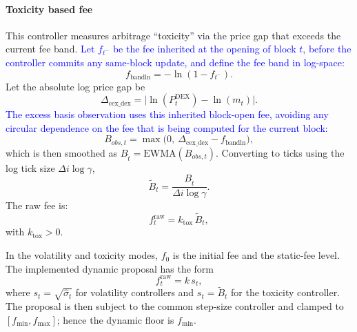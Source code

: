 \documentclass[11pt]{article}
\begin{document}
\paragraph{Toxicity based fee}
This controller measures arbitrage ``toxicity'' via the price gap that exceeds the current fee band.
\textcolor{blue}{Let $f_{t^-}$ be the fee inherited at the opening of block $t$, before the controller commits any same-block update, and define the fee band in log-space:}
\begin{equation}
  f_{\mathrm{band ln}} = -\ln(1-f_{t^-}).
\end{equation}
Let the absolute log price gap be
\begin{equation}
      \Delta_{\mathrm{cex\_dex}} = \bigl|\ln(P^{\mathrm{DEX}}_t) - \ln(m_t)\bigr|.
\end{equation}
\textcolor{blue}{The excess basis observation uses this inherited block-open fee, avoiding any circular dependence on the fee that is being computed for the current block:}
\begin{equation}
  B_{obs,t} = \max\!\bigl(0,\ \Delta_{\mathrm{cex\_dex}} - f_{\mathrm{band ln}}\bigr),
  \label{eq:basis-obs}
\end{equation}
which is then smoothed as $B_{\hat{t}}=\mathrm{EWMA}(B_{obs,t})$.
Converting to ticks using the log tick size $\Delta i\log{\gamma}$,
\begin{equation}
  \tilde{B}_t = \frac{B_{\hat{t}}}{\Delta i\log{\gamma}}.
\end{equation}
The raw fee is:
\begin{equation}
  f^{\mathrm{raw}}_t = k_{\mathrm{tox}}\, \tilde{B}_t ,
  \label{eq:tox-fee}
\end{equation}
with $k_{\mathrm{tox}}>0$.

In the volatility and toxicity modes, $f_0$ is the initial fee and the static-fee level. 
The implemented dynamic proposal has the form
\begin{equation}
  f_t^{\mathrm{raw}}=k\,s_t,
\end{equation}
where $s_t=\sqrt{\hat\sigma_t}$ for volatility controllers and $s_t=\tilde B_t$ for the toxicity controller. The proposal is then subject to the common step-size controller and clamped to $[f_{\min},f_{\max}]$; hence the dynamic floor is $f_{\min}$.
\end{document}
